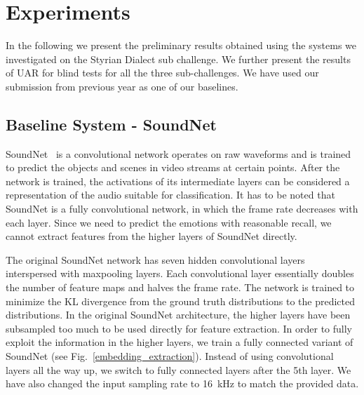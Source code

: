 \section{Experiments}

In the following we present the preliminary  results obtained using the systems we investigated on the Styrian Dialect sub challenge. We further present the results of UAR for blind tests for all the three sub-challenges. We have used our submission from previous year as one of our baselines.

\subsection{Baseline System - SoundNet}



SoundNet~\cite{aytar2016soundnet} is a convolutional network operates on raw waveforms and is trained to predict the objects and scenes in video streams at certain points.  After the network is trained, the activations of its intermediate layers can be considered a representation of the audio suitable for classification. It has to be noted that SoundNet is a fully convolutional network, in which the frame rate decreases with each layer. Since we need to predict the emotions with reasonable recall, we cannot extract features from the higher layers of SoundNet directly. 


The original SoundNet network has seven hidden convolutional layers interspersed with maxpooling layers. Each convolutional layer essentially doubles the number of feature maps and halves the frame rate. The network is trained to minimize the KL divergence from the ground truth distributions to the predicted distributions. In the original SoundNet architecture, the higher layers have been subsampled too much to be used directly for feature extraction. In order to fully exploit the information in the higher layers, we train a fully connected variant of SoundNet (see Fig.~\ref{embedding_extraction}). Instead of using convolutional layers all the way up, we switch to fully connected layers after the 5th layer.  We have also changed the input sampling rate to \SI{16}{\kilo\Hz} to match the provided data. 



